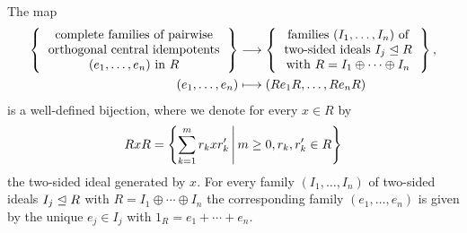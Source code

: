 \begin{theorem}
  \label{theorem: correspondence central idempotents and direct decompositions}
  The map
  \begin{align*}
    \left\{
      \begin{tabular}{c}
        complete families of pairwise \\
        orthogonal central idempotents  \\
        $(e_1, \dotsc, e_n)$ in $R$
      \end{tabular}
    \right\}
    &\longto
      \left\{
      \begin{tabular}{c}
        families $(I_1, \dotsc, I_n)$ of  \\
        two-sided ideals $I_j \idealleq R$ \\
        with $R = I_1 \oplus \dotsb \oplus I_n$
      \end{tabular}
      \right\},
    \\
                  (e_1, \dotsc, e_n)
    &\longmapsto  (R e_1 R, \dotsc, R e_n R)
  \end{align*}
  is a well-defined bijection, where we denote for every $x \in R$ by
  \[
      R x R
    = \left\{
        \sum_{k=1}^m r_k x r'_k
      \suchthat*
        m \geq 0,
        r_k, r'_k \in R
      \right\}
  \]
  the two-sided ideal generated by $x$.
  For every family  $(I_1, \dotsc, I_n)$ of two-sided ideals $I_j \trianglelefteq R$ with $R = I_1 \oplus \dotsb \oplus I_n$ the corresponding family $(e_1, \dotsc, e_n)$ is given by the unique $e_j \in I_j$ with $1_R = e_1 + \dotsb + e_n$.
\end{theorem}



